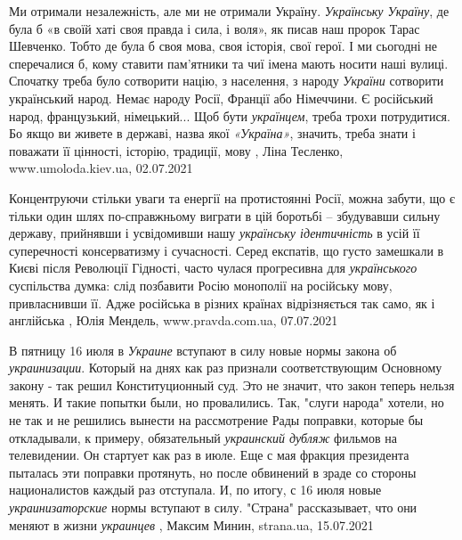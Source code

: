 Ми отримали незалежність, але ми не отримали Україну. \emph{Українську Україну}, де
була б «в своїй хаті своя правда і сила, і воля», як писав наш пророк Тарас
Шевченко. Тобто де була б своя мова, своя історія, свої герої. І ми сьогодні не
сперечалися б, кому ставити пам’ятники та чиї імена мають носити наші вулиці.
Спочатку треба було сотворити націю, з населення, з народу \emph{України} сотворити
український народ. Немає народу Росії, Франції або Німеччини. Є російський
народ, французький, німецький... Щоб бути \emph{українцем}, треба трохи потрудитися.
Бо якщо ви живете в державі, назва якої \emph{«Україна»}, значить, треба знати і
поважати її цінності, історію, традиції, мову
, 
Ліна Тесленко, www.umoloda.kiev.ua, 02.07.2021

Концентруючи стільки уваги та енергії на протистоянні Росії, можна забути, що є
тільки один шлях по-справжньому виграти в цій боротьбі – збудувавши сильну
державу, прийнявши і усвідомивши нашу \emph{українську ідентичність} в усій її
суперечності консерватизму і сучасності.  Серед експатів, що густо замешкали в
Києві після Революції Гідності, часто чулася прогресивна для
\emph{українського} суспільства думка: слід позбавити Росію монополії на
російську мову, привласнивши її. Адже російська в різних країнах відрізняється
так само, як і англійська
, 
Юлія Мендель, www.pravda.com.ua, 07.07.2021

В пятницу 16 июля в \emph{Украине} вступают в силу новые нормы закона об \emph{украинизации}.
Который на днях как раз признали соответствующим Основному закону - так решил
Конституционный суд.  Это не значит, что закон теперь нельзя менять. И такие
попытки были, но провалились.  Так, "слуги народа" хотели, но не так и не
решились вынести на рассмотрение Рады поправки, которые бы откладывали, к
примеру, обязательный \emph{украинский дубляж} фильмов на телевидении. Он стартует как
раз в июле. Еще с мая фракция президента пыталась эти поправки протянуть, но
после обвинений в зраде со стороны националистов каждый раз отступала.  И, по
итогу, с 16 июля новые \emph{украинизаторские} нормы вступают в силу.  "Страна"
рассказывает, что они меняют в жизни \emph{украинцев}
, 
Максим Минин, strana.ua, 15.07.2021

